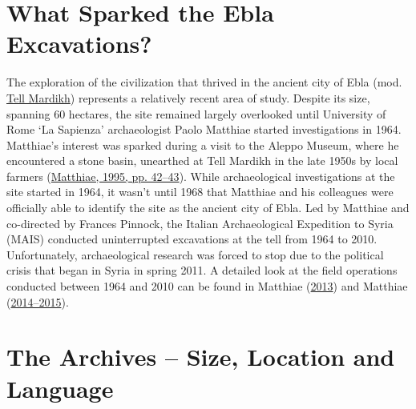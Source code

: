 \documentclass[
]{book}
\begin{document}
\hypertarget{what-sparked-the-ebla-excavations}{%
\section{What Sparked the Ebla Excavations?}\label{what-sparked-the-ebla-excavations}}

The exploration of the civilization that thrived in the ancient city of Ebla (mod. \href{https://pleiades.stoa.org/places/869702586}{Tell Mardikh}) represents a relatively recent area of study. Despite its size, spanning 60 hectares, the site remained largely overlooked until University of Rome `La Sapienza' archaeologist Paolo Matthiae started investigations in 1964. Matthiae's interest was sparked during a visit to the Aleppo Museum, where he encountered a stone basin, unearthed at Tell Mardikh in the late 1950s by local farmers (\protect\hyperlink{ref-Matthiae1995a}{Matthiae, 1995, pp. 42--43}). While archaeological investigations at the site started in 1964, it wasn't until 1968 that Matthiae and his colleagues were officially able to identify the site as the ancient city of Ebla.
Led by Matthiae and co-directed by Frances Pinnock, the Italian Archaeological Expedition to Syria (MAIS) conducted uninterrupted excavations at the tell from 1964 to 2010. Unfortunately, archaeological research was forced to stop due to the political crisis that began in Syria in spring 2011. A detailed look at the field operations conducted between 1964 and 2010 can be found in Matthiae (\protect\hyperlink{ref-Matthiae2013d}{2013}) and Matthiae (\protect\hyperlink{ref-Matthiae2014d}{2014--2015}).

\hypertarget{the-archives-size-location-and-language}{%
\section{The Archives -- Size, Location and Language}\label{the-archives-size-location-and-language}}
\end{document}

